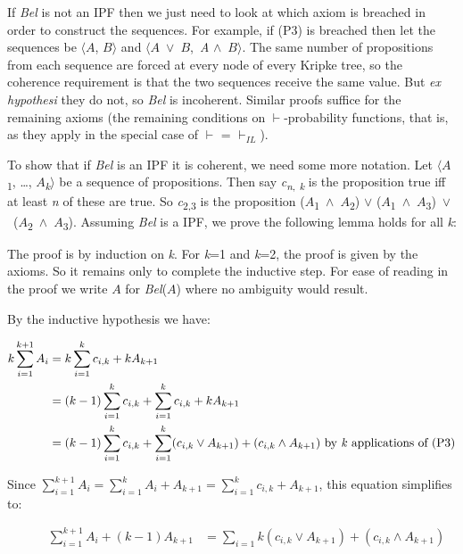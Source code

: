 \documentclass[
  11pt,
  letterpaper,
  DIV=11,
  numbers=noendperiod,
  oneside]{scrartcl}
\begin{document}
If \emph{Bel} is not an IPF then we just need to look at which axiom is
breached in order to construct the sequences. For example, if (P3) is
breached then let the sequences be \(\langle\)\(A\), \(B\)\(\rangle\)
and \(\langle\)\(A\)~\({\vee}\)~\(B\),~\emph{A}
\({\wedge}\)~\(B\)\(\rangle\). The same number of propositions from each
sequence are forced at every node of every Kripke tree, so the coherence
requirement is that the two sequences receive the same value. But
\emph{ex hypothesi} they do not, so \emph{Bel} is incoherent. Similar
proofs suffice for the remaining axioms (the remaining conditions on
\(\vdash\)-probability functions, that is, as they apply in the special
case of \(\vdash\) = \(\vdash_{IL}\)).

To show that if \emph{Bel} is an IPF it is coherent, we need some more
notation. Let \(\langle\)\(A\)\textsubscript{1}, \ldots,
\(A\)\textsubscript{\emph{k}}\(\rangle\) be a sequence of propositions.
Then say \emph{c\textsubscript{n}}\textsubscript{,}
\textsubscript{\emph{k}} is the proposition true iff at least \emph{n}
of these are true. So \emph{c}\textsubscript{2,3} is the proposition
(\(A\)\textsubscript{1}~\({\wedge}\)~\(A\)\textsubscript{2}) \({\vee}\)
(\(A\)\textsubscript{1}~\({\wedge}\)~\(A\)\textsubscript{3})~\({\vee}\)~(\(A\)\textsubscript{2}~\({\wedge}\)~\(A\)\textsubscript{3}).
Assuming \emph{Bel} is a IPF, we prove the following lemma holds for all
\emph{k}:

The proof is by induction on \emph{k}. For \emph{k}=1 and \emph{k}=2,
the proof is given by the axioms. So it remains only to complete the
inductive step. For ease of reading in the proof we write \(A\) for
\emph{Bel}(\(A\)) where no ambiguity would result.

By the inductive hypothesis we have:

\[
\begin{aligned}
k\sum^{k+1}_{i=1}A_{i} &= k \sum^k_{i=1}c_{i,k} + kA_{k+1} \\
 &= (k-1)\sum_{i=1}^kc_{i,k} + \sum^k_{i=1}c_{i,k} + kA_{k+1} \\
 &= (k-1)\sum_{i=1}^{k}c_{i,k} + \sum^{k}_{i=1}(c_{i,k} \vee A_{k+1}) + (c_{i,k} \wedge A_{k+1}) \text{ by \textit{k} applications of (P3)}
\end{aligned}
\]

Since
\(\sum_{i=1}^{k+1}A_i = \sum_{i=1}^{k}A_i + A_{k+1} = \sum_{i=1}^{k}c_{i,k} + A_{k+1}\),
this equation simplifies to:

\begin{figure*}

\[
\begin{aligned}
\sum_{i=1}^{k+1}A_i + (k-1)A_{k+1} &= \sum_{i=1}{k}(c_{i,k} \vee A_{k+1}) + (c_{i,k} \wedge A_{k+1})
\end{aligned}
\]

\end{figure*}%
\end{document}
